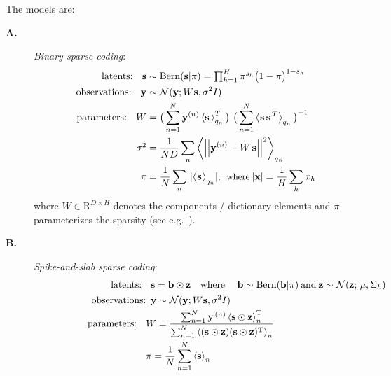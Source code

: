 \documentclass[12pt]{article}
\newcommand{\disT}{\textstyle}
\newcommand{\disS}{\displaystyle}
\newcommand{\One}{I}
\renewcommand{\vec}[1]{{\mathbf{#1}}}
\newcommand{\E}[1]{\left\langle{}#1\right\rangle} %
\newcommand{\sVec}{\vec{s}}
\newcommand{\zVec}{\vec{z}}
\newcommand{\yVecN}{\vec{y}^{\,(n)}}
\newcommand{\piVec}{\vec{\pi}}
\newcommand{\TT}{\mathrm{T}}
\begin{document}
The models  are:
%
\begin{description}
%
\item[\textbf{A.}] \textit{Binary sparse coding}:
%
\vspace{-.1cm}
\begin{align}
\text{latents: } \,\,\,         \vec{s} &\sim \mathrm{Bern}(\vec{s} | \pi) = \disT\prod_{h=1}^H \pi^{s_h} \big( 1 - \pi \big)^{1-s_h}\nonumber \\
\text{observations:  }\,\,\,    \vec{y} &\sim \mathcal{N}(\vec{y}; W\vec{s}, \sigma^2\One)\nonumber \\ 
\rev{\text{parameters: }} \,\,\,  %
\disT{}\rev{W} &= \big( \sum_{n=1}^{N} \vec{y}^{(n)} \E{\vec{s}\,}^T_{q_n} \big)\ \big( \sum_{n=1}^{N} \left< \vec{s}\,\vec{s}^{\,T}\right>_{q_n}\big)^{-1}\, \nonumber\\
\rev{\disT{}\sigma^2} &= \frac{1}{ND} \sum_{n} \left< \left|\left| \vec{y}^{(n)} - W \, \vec{s} \right|\right|^2 \right>_{q_n}\hspace{-2mm}\nonumber\\
\rev{\pi} &= \frac{1}{N} \sum_{n}\, |\big< \vec{s} \big>_{q_n}|,\:\:\mbox{\small where}\:|\vec{x}|=\frac{1}{H}\disS\sum_{h}x_h \nonumber
\end{align}
%
where $W \in \mathrm{R}^{D \times H}$ denotes the components / dictionary elements and $\pi$ parameterizes the sparsity (see e.g.~\citep{HennigesEtAl2010}).
%
\item[\textbf{B.}] \textit{Spike-and-slab sparse coding}:
\vspace{-.2cm}
\begin{align}
\text{latents: } & \,\,\,\vec{s} = \vec{b}\odot\vec{z}
\text{\quad}\mathrm{where\;}\quad \vec{b}\sim \mathrm{Bern}(\vec{b} | \pi)
\:\mathrm{and} \:
\vec{z} \sim \mathcal{N}(\vec{z};\,\vec{\mu} , \Sigma_h)\nonumber\\
\text{\quad}\text{observations:} & \,\,\, \vec{y} \sim \mathcal{N}(\vec{y}; W\vec{s}, \sigma^2\One)\text{\quad}\text{\quad}\nonumber\\
\text{\quad}\text{\quad}\text{\quad}\text{\quad}\text{\quad}\rev{\text{\;\;parameters: }} \,\,\,   
  &\rev{W} = \frac{\sum_{n=1}^{N} \yVecN \E{\sVec\odot\zVec}^{\TT}_n}
  {\sum_{n=1}^{N} \E{(\sVec\odot\zVec)(\sVec\odot\zVec)^{\TT}}_n } \nonumber\\
%
&\rev{\piVec} =
\frac{1}{N}\sum_{n=1}^{N}\E{\sVec}_n \nonumber\\

\end{align}
\end{description}
\end{document}
